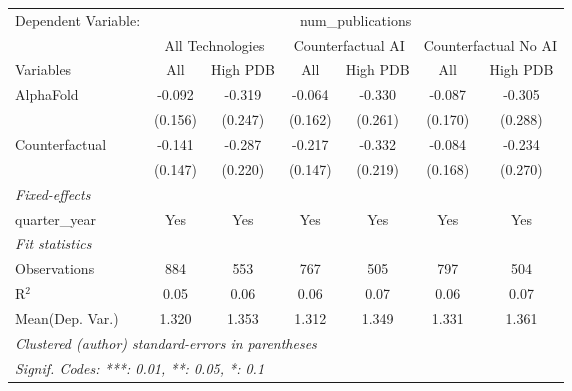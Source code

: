 \begingroup
\centering
\begin{tabular}{lcccccc}
   \tabularnewline \midrule \midrule
   Dependent Variable: & \multicolumn{6}{c}{num\_publications}\\
 & \multicolumn{2}{c}{All Technologies} & \multicolumn{2}{c}{Counterfactual AI} & \multicolumn{2}{c}{Counterfactual No AI} \\
\cmidrule(lr){1-1}\cmidrule(lr){2-3} \cmidrule(lr){4-5} \cmidrule(lr){6-7}
Variables & \multicolumn{1}{c}{All} & \multicolumn{1}{c}{High PDB} & \multicolumn{1}{c}{All} & \multicolumn{1}{c}{High PDB} & \multicolumn{1}{c}{All} & \multicolumn{1}{c}{High PDB} \\
\cmidrule(lr){1-1}\cmidrule(lr){2-2} \cmidrule(lr){3-3} \cmidrule(lr){4-4} \cmidrule(lr){5-5} \cmidrule(lr){6-6} \cmidrule(lr){7-7}
   AlphaFold      & -0.092  & -0.319  & -0.064  & -0.330  & -0.087  & -0.305\\   
                  & (0.156) & (0.247) & (0.162) & (0.261) & (0.170) & (0.288)\\   
   Counterfactual & -0.141  & -0.287  & -0.217  & -0.332  & -0.084  & -0.234\\   
                  & (0.147) & (0.220) & (0.147) & (0.219) & (0.168) & (0.270)\\   
   \midrule
   \emph{Fixed-effects}\\
   quarter\_year  & Yes     & Yes     & Yes     & Yes     & Yes     & Yes\\  
   \midrule
   \emph{Fit statistics}\\
   Observations   & 884     & 553     & 767     & 505     & 797     & 504\\  
   R$^2$          & 0.05    & 0.06    & 0.06    & 0.07    & 0.06    & 0.07\\  
Mean(Dep. Var.) & 1.320 & 1.353 & 1.312 & 1.349 & 1.331 & 1.361 \\
   \midrule \midrule
   \multicolumn{7}{l}{\emph{Clustered (author) standard-errors in parentheses}}\\
   \multicolumn{7}{l}{\emph{Signif. Codes: ***: 0.01, **: 0.05, *: 0.1}}\\
\end{tabular}
\par\endgroup
